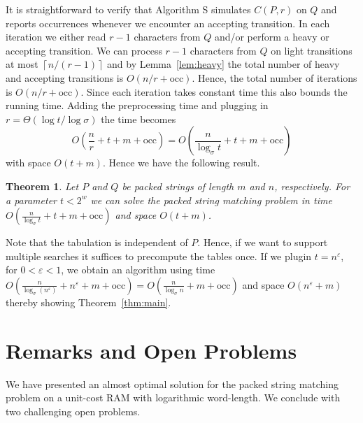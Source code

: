 \documentclass{article}
\newcommand{\occ}{\ensuremath{\mathrm{occ}}}
\newcommand{\ceil}[1]{\left\lceil{#1}\right\rceil}
\newtheorem{theorem}{Theorem}
\begin{document}
It is straightforward to verify that Algorithm S simulates $C(P,r)$ on
$Q$ and reports occurrences whenever we encounter an accepting
transition. In each iteration we either read $r-1$ characters from $Q$
and/or perform a heavy or accepting transition. We can process $r-1$
characters from $Q$ on light transitions at most $\ceil{n/(r-1)}$ and by
Lemma~\ref{lem:heavy} the total number of heavy and accepting
transitions is $O(n/r + \occ)$. Hence, the total number of iterations
is $O(n/r + \occ)$. Since each iteration takes constant time this also
bounds the running time. Adding the preprocessing time and plugging in
$r = \Theta(\log t/ \log \sigma)$ the time becomes
$$
O\left(\frac{n}{r} + t + m + \occ\right) = O\left(\frac{n}{\log_\sigma
    t} + t + m + \occ\right)
$$
with space $O(t + m)$. Hence we have the following result.
\begin{theorem}
  Let $P$ and $Q$ be packed strings of length $m$ and $n$,
  respectively. For a parameter $t < 2^w$ we can solve the packed
  string matching problem in time $O\left(\frac{n}{\log_\sigma t} + t
    + m + \occ\right)$ and space $O(t + m)$.
\end{theorem}
Note that the tabulation is independent of $P$. Hence, if we want to
support multiple searches it suffices to precompute the tables
once. If we plugin $t = n^{\varepsilon}$, for $0 < \varepsilon < 1$,
we obtain an algorithm using time $O\left(\frac{n}{\log_\sigma
    (n^\varepsilon)} + n^\varepsilon + m + \occ\right) =
O\left(\frac{n}{\log_\sigma n} + m + \occ\right)$ and space
$O(n^\varepsilon + m)$ thereby showing Theorem~\ref{thm:main}.

\section{Remarks and Open Problems}\label{sec:remarks}
We have presented an almost optimal solution for the packed string
matching problem on a unit-cost RAM with logarithmic word-length. We
conclude with two challenging open problems.
\end{document}
